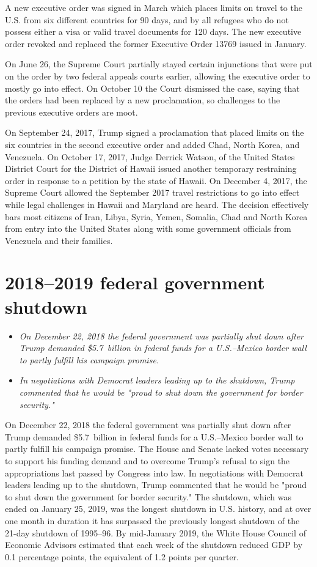 A new executive order was signed in March which places limits on travel
to the U.S. from six different countries for 90 days, and by all
refugees who do not possess either a visa or valid travel documents for
120 days. The new executive order revoked and replaced the former
Executive Order 13769 issued in January.

On June 26, the Supreme Court partially stayed certain injunctions that
were put on the order by two federal appeals courts earlier, allowing
the executive order to mostly go into effect. On October 10 the Court
dismissed the case, saying that the orders had been replaced by a new
proclamation, so challenges to the previous executive orders are moot.

On September 24, 2017, Trump signed a proclamation that placed limits on
the six countries in the second executive order and added Chad, North
Korea, and Venezuela. On October 17, 2017, Judge Derrick Watson, of the
United States District Court for the District of Hawaii issued another
temporary restraining order in response to a petition by the state of
Hawaii. On December 4, 2017, the Supreme Court allowed the September
2017 travel restrictions to go into effect while legal challenges in
Hawaii and Maryland are heard. The decision effectively bars most
citizens of Iran, Libya, Syria, Yemen, Somalia, Chad and North Korea
from entry into the United States along with some government officials
from Venezuela and their families.

\section{2018--2019 federal government
shutdown}\label{federal-government-shutdown}

\begin{itemize}
\item
  \emph{On December 22, 2018 the federal government was partially shut
  down after Trump demanded \$5.7~billion in federal funds for a
  U.S.--Mexico border wall to partly fulfill his campaign promise.}
\item
  \emph{In negotiations with Democrat leaders leading up to the
  shutdown, Trump commented that he would be "proud to shut down the
  government for border security."}
\end{itemize}

On December 22, 2018 the federal government was partially shut down
after Trump demanded \$5.7~billion in federal funds for a U.S.--Mexico
border wall to partly fulfill his campaign promise. The House and Senate
lacked votes necessary to support his funding demand and to overcome
Trump's refusal to sign the appropriations last passed by Congress into
law. In negotiations with Democrat leaders leading up to the shutdown,
Trump commented that he would be "proud to shut down the government for
border security." The shutdown, which was ended on January 25, 2019, was
the longest shutdown in U.S. history, and at over one month in duration
it has surpassed the previously longest shutdown of the 21-day shutdown
of 1995--96. By mid-January 2019, the White House Council of Economic
Advisors estimated that each week of the shutdown reduced GDP by 0.1
percentage points, the equivalent of 1.2 points per quarter.

